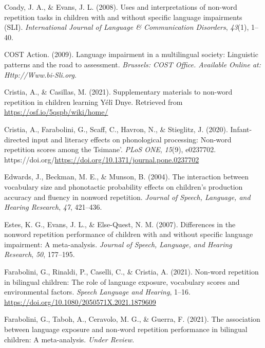 \documentclass[
  american,
  ,man,floatsintext]{apa6}
\newlength{\cslhangindent}
\newlength{\cslentryspacingunit} %
\newenvironment{CSLReferences}[2] %
 {%
  \setlength{\parindent}{0pt}
  \ifodd #1
  \let\oldpar\par
  \def\par{\hangindent=\cslhangindent\oldpar}
  \fi
  \setlength{\parskip}{#2\cslentryspacingunit}
 }%
 {}
\begin{document}
\begin{CSLReferences}{1}{0}
\leavevmode{}%
Coady, J. A., \& Evans, J. L. (2008). Uses and interpretations of non-word repetition tasks in children with and without specific language impairments (SLI). \emph{International Journal of Language \& Communication Disorders}, \emph{43}(1), 1--40.

\leavevmode{}%
COST Action. (2009). Language impairment in a multilingual society: Linguistic patterns and the road to assessment. \emph{Brussels: COST Office. Available Online at: Http://Www.bi-Sli.org}.

\leavevmode{}%
Cristia, A., \& Casillas, M. (2021). Supplementary materials to non-word repetition in children learning {Yélî D}nye. Retrieved from \url{https://osf.io/5qspb/wiki/home/}

\leavevmode{}%
Cristia, A., Farabolini, G., Scaff, C., Havron, N., \& Stieglitz, J. (2020). Infant-directed input and literacy effects on phonological processing: Non-word repetition scores among the {T}simane'. \emph{PLoS ONE}, \emph{15}(9), e0237702. https://doi.org/\url{https://doi.org/10.1371/journal.pone.0237702}

\leavevmode{}%
Edwards, J., Beckman, M. E., \& Munson, B. (2004). The interaction between vocabulary size and phonotactic probability effects on children's production accuracy and fluency in nonword repetition. \emph{Journal of Speech, Language, and Hearing Research}, \emph{47}, 421--436.

\leavevmode{}%
Estes, K. G., Evans, J. L., \& Else-Quest, N. M. (2007). Differences in the nonword repetition performance of children with and without specific language impairment: A meta-analysis. \emph{Journal of Speech, Language, and Hearing Research}, \emph{50}, 177--195.

\leavevmode{}%
Farabolini, G., Rinaldi, P., Caselli, C., \& Cristia, A. (2021). Non-word repetition in bilingual children: The role of language exposure, vocabulary scores and environmental factors. \emph{Speech Language and Hearing}, 1--16. \url{https://doi.org/10.1080/2050571X.2021.1879609}

\leavevmode{}%
Farabolini, G., Taboh, A., Ceravolo, M. G., \& Guerra, F. (2021). The association between language exposure and non-word repetition performance in bilingual children: A meta-analysis. \emph{Under Review}.


\end{CSLReferences}
\end{document}

